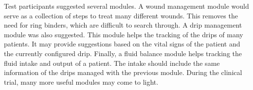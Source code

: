     Test participants suggested several modules. A wound management module would serve as a collection of steps to treat many different wounds. This removes the need for ring binders, which are difficult to search through. A drip management module was also suggested. This module helps the tracking of the drips of many patients. It may provide suggestions based on the vital signs of the patient and the currently configured drip. Finally, a fluid balance module helps tracking the fluid intake and output of a patient. The intake should include the same information of the drips managed with the previous module. During the clinical trial, many more useful modules may come to light.


